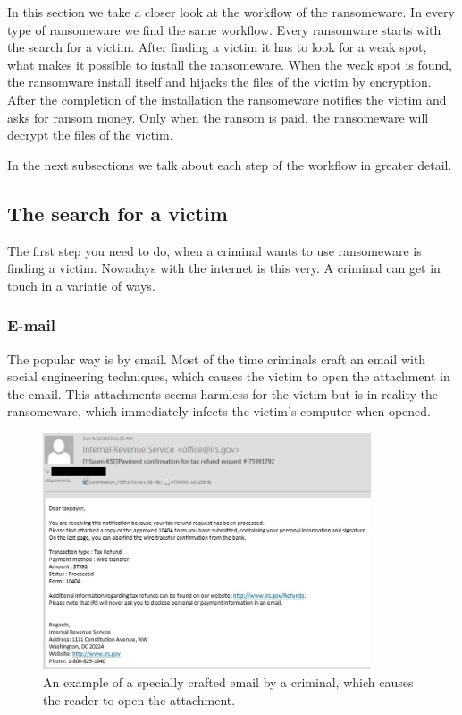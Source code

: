 In this section we take a closer look at the workflow of the ransomeware. In every type of ransomeware we find the same workflow. Every ransomware starts with the search for a victim. After finding a victim it has to look for a weak spot, what makes it possible to install the ransomeware. When the weak spot is found, the ransomware install itself and hijacks the files of the victim by encryption. After the completion of the installation the ransomeware notifies the victim and asks for ransom money. Only when the ransom is paid, the ransomeware will decrypt the files of the victim.

In the next subsections we talk about each step of the workflow in greater detail.

\subsection{The search for a victim}\label{search}

The first step you need to do, when a criminal wants to use ransomeware is finding a victim. Nowadays with the internet is this very. A criminal can get in touch in a variatie of ways.

\subsubsection{E-mail}

The popular way is by email. Most of the time criminals craft an email with social engineering techniques, which causes the victim to open the attachment in the email. This attachments seems harmless for the victim but is in reality the ransomeware, which immediately infects the victim's computer when opened.


\begin{figure}[H]
    \centering 
    \includegraphics[height=7cm]{example_ransomemail}
    \caption[]{An example of a specially crafted email by a criminal, which causes the reader to open the attachment.\protect\footnotemark}
    \label{ransomemail}
\end{figure}

